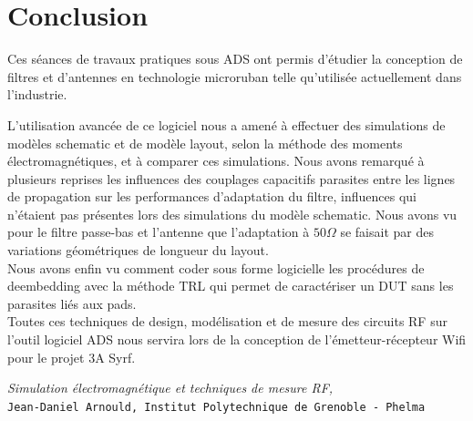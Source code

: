 \documentclass[a4paper]{article}
\begin{document}
\section{Conclusion}

Ces s\'eances de travaux pratiques sous ADS ont permis d'\'etudier la conception de filtres et
 d'antennes en technologie microruban telle qu'utilis\'ee actuellement dans l'industrie.

L'utilisation avanc\'ee de ce logiciel nous a amen\'e \`a effectuer des simulations de mod\`eles schematic et de mod\`ele layout, selon la m\'ethode des
 moments \'electromagn\'etiques, et \`a comparer ces simulations. Nous avons remarqu\'e \`a plusieurs reprises les influences des couplages capacitifs
parasites entre les lignes de propagation sur les performances d'adaptation du filtre, influences qui n'\'etaient pas pr\'esentes lors des simulations
du mod\`ele schematic.
Nous avons vu pour le filtre passe-bas et l'antenne que l'adaptation \`a $50 \Omega$ se faisait par des variations g\'eom\'etriques de longueur du layout.\\

Nous avons enfin vu comment coder sous forme logicielle les proc\'edures de deembedding avec la m\'ethode TRL qui permet de caract\'eriser un DUT sans les parasites li\'es aux pads.\\

Toutes ces techniques de design, mod\'elisation et de mesure des circuits RF sur l'outil logiciel ADS nous servira lors de la conception de
 l'\'emetteur-r\'ecepteur Wifi pour le projet 3A Syrf.

\clearpage
{}

\begin{thebibliography}{9}

\textit{Simulation \'electromagn\'etique et techniques de mesure RF,}\\
\texttt{Jean-Daniel Arnould, Institut Polytechnique de Grenoble - Phelma}

\end{thebibliography}
\end{document}
